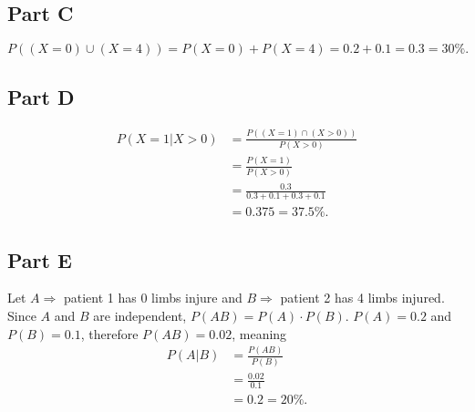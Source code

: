 \documentclass[12pt]{extarticle}
\begin{document}
\subsection*{Part C}
\[
	P((X=0) \cup (X=4)) = P(X=0) + P(X=4) = 0.2 + 0.1 = 0.3 = 30\%
.\]

\subsection*{Part D}
\begin{align*}
	P(X=1 | X>0) &= \frac{P((X=1)\cap (X>0))}{P(X > 0)} \\
	&= \frac{P(X=1)}{P(X>0)} \\
	&= \frac{0.3}{0.3 + 0.1 + 0.3 + 0.1} \\
	&= 0.375 = 37.5\%
.\end{align*}

\subsection*{Part E}
Let $A \Rightarrow$ patient 1 has 0 limbs injure and $B \Rightarrow$ patient 2 has 4 limbs injured. Since $A$ and $B$ are independent, $P(AB) = P(A) \cdot P(B)$. $P(A) = 0.2$ and $P(B) = 0.1$, therefore $P(AB) = 0.02$, meaning
\begin{align*}
	P(A | B) &= \frac{P(AB)}{P(B)} \\
	&= \frac{0.02}{0.1} \\
	&= 0.2 = 20\%
.\end{align*}
\end{document}
